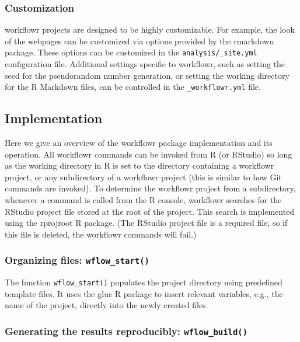 \documentclass[9pt,a4paper]{extarticle}
\begin{document}
\subsubsection*{Customization}

workflowr projects are designed to be highly customizable. For example,
the look of the webpages can be customized via options provided by the
rmarkdown package. These options can be customized in the
\verb|analysis/_site.yml| configuration file. Additional settings
specific to workflowr, such as setting the seed for the pseudorandom
number generation, or setting the working directory for the R Markdown
files, can be controlled in the \verb|_workflowr.yml| file.

\subsection*{Implementation}

Here we give an overview of the workflowr package implementation and its operation. All workflowr commands can be invoked from R (or RStudio) so long as the working directory in R is set to the directory containing a workflowr project, or any subdirectory of a workflowr project (this is similar to how Git commands are invoked). To determine the workflowr project from a subdirectory, whenever a command is called from the R console, workflowr searches for the RStudio project file stored at the root of the project. This search is implemented using the rprojroot R package. (The RStudio project file is a required file, so if this file is deleted, the workflowr commands will fail.)

\subsubsection*{Organizing files: \verb|wflow_start()|}

The function \verb|wflow_start()| populates the project directory using
predefined template files. It uses the glue R package to insert relevant
variables, e.g., the name of the project, directly into the newly
created files.

\subsubsection*{Generating the results reproducibly: \verb|wflow_build()|}
\end{document}
